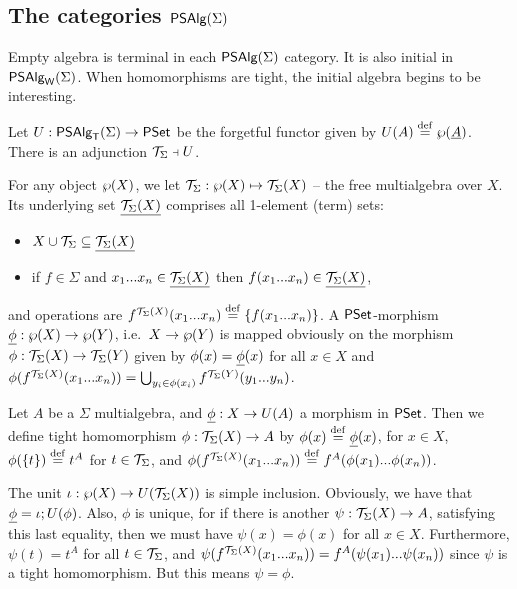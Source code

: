 \documentclass[10pt]{article}
\begin{document}



\subsection{The categories $\mbox{\sf PSAlg}(\Sigma)$}

Empty algebra is terminal in each $\mbox{\sf PSAlg}(\Sigma)$ category.
It is also initial in $\mbox{\sf PSAlg}_{\sf W}(\Sigma)$.
When homomorphisms are tight, the initial algebra begins to be interesting.

\begin{Theorem}
\label{le:MAPStADJ}
Let $U:\mbox{\sf PSAlg}_{\sf T}(\Sigma)\rightarrow\mbox{\rm\sf PSet}$ be the forgetful functor given by
$U(A)\stackrel{{\rm \tiny{def}}}=\wp(\underline {A})$.  There is an adjunction ${\cal T}_{\Sigma}\mathrel{\scriptstyle\dashv} U$.
\end{Theorem}

\begin{Proof}
For any object $\wp(X)$, we let ${\cal T}_{\Sigma}:\wp(X)\mapsto {\cal T}_{\Sigma}(X)$
-- the free multialgebra over $X$. Its underlying set $\underline {{\cal T}_{\Sigma}(X)}$ comprises all 1-element (term) sets:

\begin{itemize}\MyLPar
\item 
$X\cup{\cal T}_{\Sigma}\subseteq \underline {{\cal T}_{\Sigma}(X)}$ 
\item 
if $f\in\Sigma$ and $x_1...x_n\in\underline {{\cal T}_{\Sigma}(X)}$ then
$f(x_1...x_n)\in\underline {{\cal T}_{\Sigma}(X)}$,
\end{itemize}
%
and operations are $f^{{\cal T}_{\Sigma}(X)}(x_1...x_n)\stackrel{{\rm \tiny{def}}}= \{f(x_1...x_n)\}$.
A $\mbox{\rm\sf PSet}$-morphism $\underline {\phi}:\wp(X)\rightarrow\wp(Y)$, i.e.\ 
$X\rightarrow\wp(Y)$ is mapped obviously on the morphism
$\phi:{\cal T}_{\Sigma}(X)\rightarrow{\cal T}_{\Sigma}(Y)$ given by $\phi(x)=\underline {\phi}(x)$ for
all $x\in X$ and $\phi(f^{{\cal T}_{\Sigma}(X)}(x_1...x_n))=
\bigcup_{y_{i}\in\phi(x_{i})}f^{{\cal T}_{\Sigma}(Y)}(y_1...y_n)$.

Let $A$ be a $\Sigma$ multialgebra, and $\underline {\phi}:X\rightarrow U(A)$
a morphism in $\mbox{\rm\sf PSet}$. Then we define tight homomorphism $\phi
:{\cal T}_{\Sigma}(X)\rightarrow A$ by $\phi(x)\stackrel{{\rm \tiny{def}}}=\underline {\phi}(x)$, for $x\in X$,
$\phi(\{t\})\stackrel{{\rm \tiny{def}}}= t^A$ for $t\in{\cal T}_{\Sigma}$, and
$\phi(f^{{\cal T}_{\Sigma}(X)}(x_1...x_n))\stackrel{{\rm \tiny{def}}}= f^A(\phi(x_1)...\phi(x_n))$.

The unit $\iota:\wp(X)\rightarrow U({\cal T}_{\Sigma}(X))$ is simple
inclusion. Obviously, we have that $\underline {\phi} =
\iota;U(\phi)$. Also, $\phi$ is unique, for if there is
another $\psi:{\cal T}_{\Sigma}(X)\rightarrow A$, satisfying this last equality, then
we must have $\psi(x)=\phi(x)$ for all $x\in X$. Furthermore,
$\psi(t)=t^A$ for all $t\in{\cal T}_{\Sigma}$, and
$\psi(f^{{\cal T}_{\Sigma}(X)}(x_1...x_n))=f^A(\psi(x_1)...\psi(x_n))$ since
$\psi$ is a tight homomorphism. But this means $\psi=\phi$.
\end{Proof}
\end{document}
